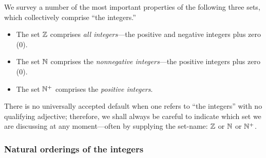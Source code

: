 We survey a number of the most important properties of the following three sets, which collectively comprise ``the integers.''
\begin{itemize}
\item
The set $\mathbb{Z}$ comprises {\em all integers}---the positive and negative integers plus zero ($0$).
\medskip\item
The set $\mathbb{N}$ comprises the {\em nonnegative integers}---the positive integers plus zero ($0$).
\medskip\item
The set $\mathbb{N}^+$ comprises the {\em positive integers}.
\end{itemize}
There is no universally accepted default when one refers to ``the integers'' with no qualifying adjective; therefore, we shall always be careful to indicate which set we are discussing at any moment---often by supplying the set-name: $\mathbb{Z}$ or $\mathbb{N}$ or $\mathbb{N}^+$.

\subsubsection{Natural orderings of the integers}
\label{sec:natural-orderings}

